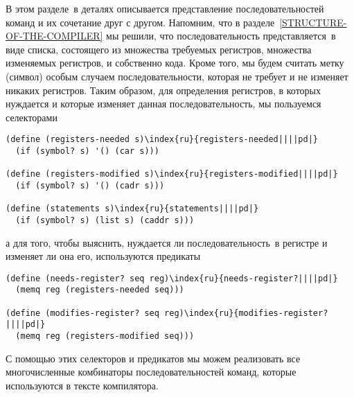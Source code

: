 В этом разделе~в деталях описывается представление
последовательностей команд и их сочетание друг с другом.  Напомним, что в
разделе~\ref{STRUCTURE-OF-THE-COMPILER} мы решили, что
последовательность представляется~в виде списка, состоящего из
множества требуемых регистров, множества изменяемых регистров, и
собственно кода.  Кроме того, мы будем считать метку
(символ) особым случаем последовательности, которая не требует и не
изменяет никаких регистров.  Таким образом, для определения регистров,
в которых нуждается и которые изменяет данная последовательность, мы
пользуемся селекторами

\begin{Verbatim}[fontsize=\small]
(define (registers-needed s)\index{ru}{registers-needed||||pd|}
  (if (symbol? s) '() (car s)))

(define (registers-modified s)\index{ru}{registers-modified||||pd|}
  (if (symbol? s) '() (cadr s)))

(define (statements s)\index{ru}{statements||||pd|}
  (if (symbol? s) (list s) (caddr s)))
\end{Verbatim}
а для того, чтобы выяснить, нуждается ли последовательность~в регистре
и изменяет ли она его, используются предикаты

\begin{Verbatim}[fontsize=\small]
(define (needs-register? seq reg)\index{ru}{needs-register?||||pd|}
  (memq reg (registers-needed seq)))

(define (modifies-register? seq reg)\index{ru}{modifies-register?||||pd|}
  (memq reg (registers-modified seq)))
\end{Verbatim}
С помощью этих селекторов и предикатов мы можем реализовать все
многочисленные комбинаторы последовательностей команд, которые используются
в тексте компилятора.

